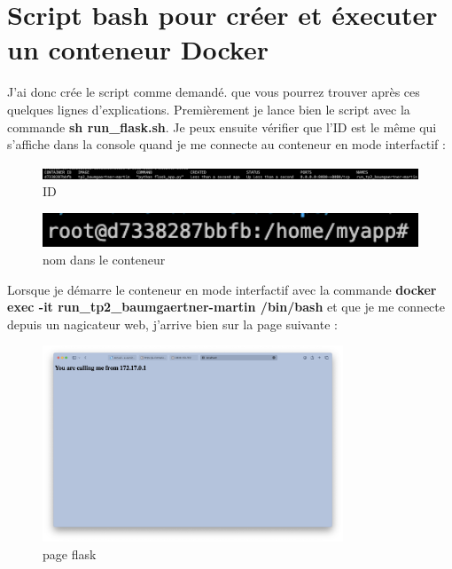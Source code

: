 \documentclass[12pt, a4paper]{article}
\begin{document}
\newpage
\section{Script bash pour créer et éxecuter un conteneur Docker}
J'ai donc crée le script comme demandé. que vous pourrez trouver après ces 
quelques lignes d'explications. Premièrement je lance bien le script
avec la commande \textbf{sh run\_flask.sh}. Je peux ensuite vérifier que l'ID
est le même qui s'affiche dans la console quand je me connecte au conteneur en 
mode interfactif : 
\begin{figure}[h]
    \centering
    \includegraphics[width=1\textwidth]{img/id1.png}
    \caption{ID}
    \label{fig:id1}
\end{figure}
\begin{figure}[h]
    \centering
    \includegraphics[width=1\textwidth]{img/id2.png}
    \caption{nom dans le conteneur}
    \label{fig:id2}
\end{figure}
Lorsque je démarre le conteneur en mode interfactif avec la commande 
\textbf{docker exec -it run\_tp2\_baumgaertner-martin /bin/bash} et que je 
me connecte depuis un nagicateur web, j'arrive bien sur la page suivante :
\begin{figure}[h]
    \centering
    \includegraphics[width=0.8\textwidth]{img/page.png}
    \caption{page flask}
    \label{fig:page}
\end{figure}

\newpage
\end{document}
